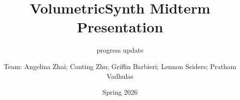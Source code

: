 



\title[]{VolumetricSynth Midterm Presentation}
\subtitle{progress update}
\author{Team: Angelina Zhai; Canting Zhu; Griffin Barbieri; Lennon Seiders; Pratham Vadhulas}
\date{Spring 2026}


    

    
    
    
    
    
    
    
    


